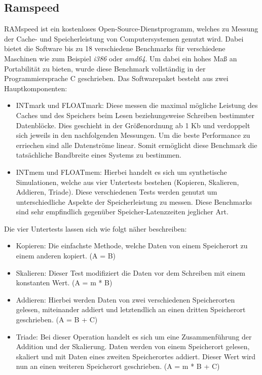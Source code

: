\subsection{Ramspeed}\label{kap:ramspeed}
RAMspeed ist ein kostenloses Open-Source-Dienstprogramm, welches zu Messung der Cache- und Speicherleistung von Computersystemen genutzt wird. Dabei bietet die Software bis zu 18 verschiedene
Benchmarks für verschiedene Maschinen wie zum Beispiel \emph{i386} oder \emph{amd64}. Um dabei ein hohes Maß an Portabilität zu bieten, wurde diese Benchmark vollständig in der Programmiersprache
C geschrieben. Das Softwarepaket besteht aus zwei Hauptkomponenten:~\cite{ramspeed}
\begin{itemize}
  \item INTmark und FLOATmark: Diese messen die maximal mögliche Leistung des Caches und des Speichers beim Lesen beziehungsweise Schreiben bestimmter Datenblöcke. Dies geschieht in der Größenordnung ab 1 Kb und
                               verdoppelt sich jeweils in den nachfolgenden Messungen. Um die beste Performance zu erriechen sind alle Datenströme linear. Somit ermöglicht diese Benchmark die
                               tatsächliche Bandbreite eines Systems zu bestimmen.
  \item INTmem und FLOATmem: Hierbei handelt es sich um synthetische Simulationen, welche aus vier Untertests bestehen (Kopieren, Skalieren, Addieren, Triade). Diese verschiedenen Tests werden
                             genutzt um unterschiedliche Aspekte der Speicherleistung zu messen. Diese Benchmarks sind sehr empfindlich gegenüber Speicher-Latenzzeiten jeglicher Art.
\end{itemize}

Die vier Untertests lassen sich wie folgt näher beschreiben:
\begin{itemize}
  \item Kopieren: Die einfachste Methode, welche Daten von einem Speicherort zu einem anderen kopiert. (A = B)
  \item Skalieren: Dieser Test modifiziert die Daten vor dem Schreiben mit einem konstanten Wert. (A = m * B)
  \item Addieren: Hierbei werden Daten von zwei verschiedenen Speicherorten gelesen, miteinander addiert und letztendlich an einen dritten Speicherort geschrieben. (A = B + C)
  \item Triade: Bei dieser Operation handelt es sich um eine Zusammenführung der Addition und der Skalierung. Daten werden von einem Speicherort gelesen, skaliert und mit Daten eines zweiten Speicherortes
                addiert. Dieser Wert wird nun an einen weiteren Speicherort geschrieben. (A = m * B + C)
\end{itemize}

